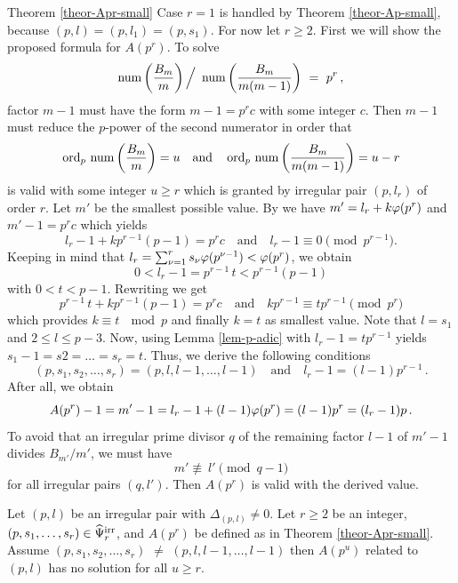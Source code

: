 \documentclass[12pt,english]{article}
\begin{document}
\begin{proofof}{Theorem \ref{theor-Apr-small}}
Case $r = 1$ is handled by Theorem \ref{theor-Ap-small},
because $(p,l)=(p,l_1)=(p,s_1)$.
For now let $r \geq 2$. First we will show the proposed formula for $A(p^r)$.
To solve
\[
    \mathop{\rm num}\nolimits \left( \frac{B_m}{m} \right) \Big/ \
        \mathop{\rm num}\nolimits \left( \frac{B_m}{m(m-1)} \right) \ = \ p^r \,,
\]
factor $m-1$ must have the form $m-1 = p^r c$ with some integer $c$. Then $m-1$ must reduce
the $p$-power of the second numerator in order that
\[
    \mathop{\rm ord}\nolimits_p \, \mathop{\rm num}\nolimits \left( \frac{B_m}{m} \right) = u \quad \mbox{and} \quad
      \mathop{\rm ord}\nolimits_p \, \mathop{\rm num}\nolimits \left( \frac{B_m}{m(m-1)} \right) = u-r
\]
is valid with some integer $u \geq r$ which is granted by irregular pair $(p,l_r)$ of order $r$.
Let $m'$ be the smallest possible value.
By 
we have $m' = l_r+k\varphi(p^r)$ and $m'-1 = p^r c$ which yields
\begin{equation} \label{eqn-loc-Apr-1}
  l_r-1 + k p^{r-1}(p-1) = p^r c  \quad \mbox{and} \quad  l_r-1 \equiv 0 \pmod{p^{r-1}} .
\end{equation}
Keeping in mind that
$l_r = \sum_{\nu=1}^{r} s_\nu \varphi( p^{\nu-1} ) < \varphi( p^r )$,
we obtain
\[
   0 < l_r-1 = p^{r-1} \, t < p^{r-1} (p-1)
\]
with $0 < t < p-1$. Rewriting  we get
\[
  p^{r-1} \, t + k p^{r-1}(p-1) = p^r c  \quad \mbox{and} \quad
    k p^{r-1} \equiv t p^{r-1} \pmod{p^{r}}
\]
which provides $k \equiv t \ \mod{p}$ and finally $k=t$ as smallest value.
Note that $l=s_1$ and $2 \leq l \leq p-3$. Now, using Lemma \ref{lem-p-adic}
with $l_r-1 = t p^{r-1}$ yields $s_1-1=s2=\ldots=s_r=t$.
Thus, we derive the following conditions
\[
   (p,s_1,s_2,\ldots,s_r) = (p,l,l-1,\ldots,l-1) \quad \mbox{and} \quad
     l_r-1 = (l-1) p^{r-1} \,.
\]
After all, we obtain
\[
   A(p^r)-1 = m'-1 = l_r - 1 + (l-1) \varphi( p^r ) = (l-1) p^r = (l_r-1) p \,.
\]
To avoid that an irregular prime divisor $q$ of the remaining factor $l-1$ of $m'-1$
divides $B_{m'}/m'$, we must have
\[
   m' \not\equiv \ l' \pmod{q-1}
\]
for all irregular pairs $(q,l')$. Then $A(p^r)$ is valid with the derived value.
\end{proofof}

\begin{corl} \label{corl-Apr-u}
Let $(p,l)$ be an irregular pair with $\Delta_{(p,l)} \neq 0$.
Let $r \geq 2$ be an integer, $(p,s_1,\ldots,s_r) \in \widehat{\Psi}^{\rm irr}_r$,
and $A(p^r)$ be defined as in Theorem \ref{theor-Apr-small}.
Assume $(p,s_1,s_2,\ldots,s_r)$ $\neq$ $(p,l,l-1,\ldots,l-1)$ then
$A(p^u)$ related to $(p,l)$ has no solution for all $u \ge r$.
\end{corl}
\end{document}

